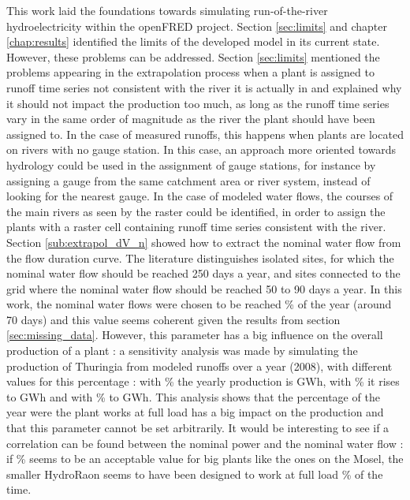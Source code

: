 This work laid the foundations towards simulating run-of-the-river hydroelectricity within the openFRED project. Section \ref{sec:limits} and chapter \ref{chap:results} identified the limits of the developed model in its current state. However, these problems can be addressed.\newline
Section \ref{sec:limits} mentioned the problems appearing in the extrapolation process when a plant is assigned to runoff time series not consistent with the river it is actually in and explained why it should not impact the production too much, as long as the runoff time series vary in the same order of magnitude as the river the plant should have been assigned to. In the case of measured runoffs, this happens when plants are located on rivers with no gauge station. In this case, an approach more oriented towards hydrology could be used in the assignment of gauge stations, for instance by assigning a gauge from the same catchment area or river system, instead of looking for the nearest gauge. In the case of modeled water flows, the courses of the main rivers as seen by the raster could be identified, in order to assign the plants with a raster cell containing runoff time series consistent with the river. \newline
Section \ref{sub:extrapol_dV_n} showed how to extract the nominal water flow from the flow duration curve. The literature distinguishes isolated sites, for which the nominal water flow should be reached 250 days a year, and sites connected to the grid where the nominal water flow should be reached 50 to 90 days a year. In this work, the nominal water flows were chosen to be reached \unit[20]{\%} of the year (around 70 days) and this value seems coherent given the results from section \ref{sec:missing_data}. However, this parameter has a big influence on the overall production of a plant : a sensitivity analysis was made by simulating the production of Thuringia from modeled runoffs over a year (2008), with different values for this percentage :  with \unit[20]{\%} the yearly production is \unit[187]{GWh}, with \unit[30]{\%} it rises to \unit[210]{GWh} and with \unit[40]{\%} to \unit[223]{GWh}. This analysis shows that the percentage of the year were the plant works at full load has a big impact on the production and that this parameter cannot be set arbitrarily. It would be interesting to see if a correlation can be found between the nominal power and the nominal water flow : if \unit[20]{\%} seems to be an acceptable value for big plants like the ones on the Mosel, the smaller HydroRaon seems to have been designed to work at full load \unit[30]{\%} of the time.
